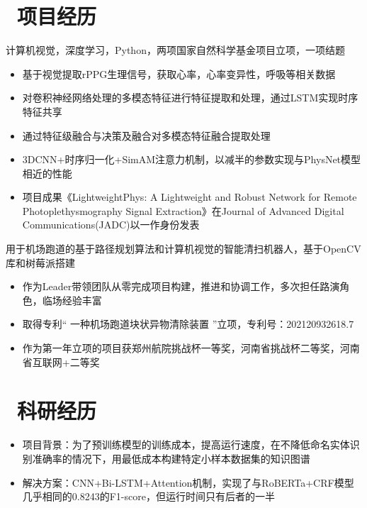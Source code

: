 \documentclass{resume}
\begin{document}
\section{\faUsers\ 项目经历}
计算机视觉，深度学习，Python，两项国家自然科学基金项目立项，一项结题
\begin{itemize}
  \item 基于视觉提取rPPG生理信号，获取心率，心率变异性，呼吸等相关数据
  \item 对卷积神经网络处理的多模态特征进行特征提取和处理，通过LSTM实现时序特征共享
  \item 通过特征级融合与决策及融合对多模态特征融合提取处理
  \item 3DCNN+时序归一化+SimAM注意力机制，以减半的参数实现与PhysNet模型相近的性能
  \item 项目成果《LightweightPhys: A Lightweight and Robust Network for Remote Photoplethysmography Signal Extraction》在Journal of Advanced Digital Communications(JADC)以一作身份发表
\end{itemize}

用于机场跑道的基于路径规划算法和计算机视觉的智能清扫机器人，基于OpenCV库和树莓派搭建
\begin{itemize}
  \item 作为Leader带领团队从零完成项目构建，推进和协调工作，多次担任路演角色，临场经验丰富
  \item 取得专利“ 一种机场跑道块状异物清除装置 ”立项，专利号：202120932618.7 
  \item 作为第一年立项的项目获郑州航院挑战杯一等奖，河南省挑战杯二等奖，河南省互联网+二等奖
\end{itemize}

\section{\faHeartO\ 科研经历}
\begin{itemize}
  \item 项目背景：为了预训练模型的训练成本，提高运行速度，在不降低命名实体识别准确率的情况下，用最低成本构建特定小样本数据集的知识图谱
  \item 解决方案：CNN+Bi-LSTM+Attention机制，实现了与RoBERTa+CRF模型几乎相同的0.8243的F1-score，但运行时间只有后者的一半
\end{itemize}
\end{document}
